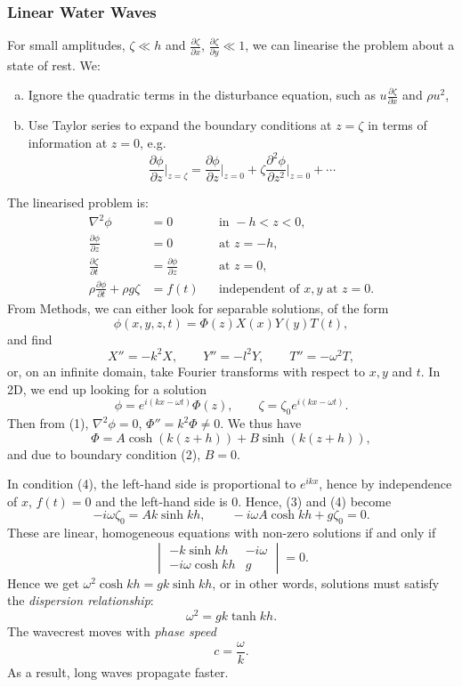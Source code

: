 \documentclass[12pt]{article}
\begin{document}
\subsubsection{Linear Water Waves}
\label{subsub:linear_water_waves}

For small amplitudes, $\zeta \ll h$ and $\frac{\partial \zeta}{\partial x}$, $\frac{\partial \zeta}{\partial y} \ll 1$, we can linearise the problem about a state of rest. We:
\begin{enumerate}[(a)]
	\item Ignore the quadratic terms in the disturbance equation, such as $u \frac{\partial \zeta}{\partial x}$ and $\rho u^2$,
	\item Use Taylor series to expand the boundary conditions at $z = \zeta$ in terms of information at $z = 0$, e.g.
		\[
		\frac{\partial \phi}{\partial z} \biggr|_{z = \zeta} = \frac{\partial \phi}{\partial z} \biggr|_{z = 0} + \zeta \frac{\partial^2 \phi}{\partial z^2} \biggr|_{z = 0} + \cdots
		\]
\end{enumerate}
The linearised problem is:
\begin{align*}
	\nabla^2 \phi &= 0 & &\text{in } -h < z < 0, \tag{1} \\
	\frac{\partial \phi}{\partial z} &= 0 & &\text{at } z = -h, \tag{2} \\
	\frac{\partial \zeta}{\partial t} &= \frac{\partial \phi}{\partial z} & &\text{at } z = 0, \tag{3} \\
	\rho \frac{\partial \phi}{\partial t} + \rho g \zeta &= f(t) & &\text{independent of } x, y \text{ at } z = 0. \tag{4}
\end{align*}
From Methods, we can either look for separable solutions, of the form
\[
\phi(x, y, z, t) = \Phi(z) X(x) Y(y) T(t),
\]
and find
\[
X'' = -k^2 X, \qquad Y'' = -l^2 Y, \qquad T'' = - \omega^2 T,
\]
or, on an infinite domain, take Fourier transforms with respect to $x, y$ and $t$. In 2D, we end up looking for a solution
\[
\phi = e^{i(kx - \omega t)}\Phi(z), \qquad \zeta = \zeta_0 e^{i(kx - \omega t)}.
\]
Then from (1), $\nabla^2 \phi = 0$, $\Phi'' = k^2 \Phi \neq 0$. We thus have
\[
\Phi = A \cosh (k(z+h)) + B \sinh (k(z+h)),
\]
and due to boundary condition (2), $B = 0$.

In condition (4), the left-hand side is proportional to $e^{ikx}$, hence by independence of $x$, $f(t) = 0$ and the left-hand side is $0$. Hence, (3) and (4) become
\[
-i \omega \zeta_0 = Ak\sinh kh, \qquad - i \omega A \cosh kh + g \zeta_0 = 0.
\]
These are linear, homogeneous equations with non-zero solutions if and only if
\[
\begin{vmatrix}
	-k \sinh kh & -i \omega \\  -i \omega \cosh kh & g
\end{vmatrix}
= 0.
\]
Hence we get $\omega^2 \cosh kh = gk \sinh kh$, or in other words, solutions must satisfy the \emph{dispersion relationship}:
\[
\omega^2 = gk \tanh kh.
\]
The wavecrest moves with \emph{phase speed}
\[
c = \frac{\omega}{k}.
\]
As a result, long waves propagate faster.
\end{document}
